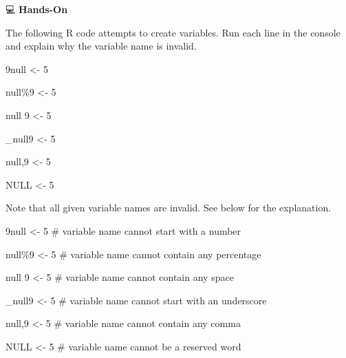 \documentclass[
  letterpaper,
  DIV=11,
  numbers=noendperiod]{scrreprt}
\newenvironment{Shaded}{\begin{snugshade}}{\end{snugshade}}
\newcommand{\CommentTok}[1]{\textcolor[rgb]{0.37,0.37,0.37}{#1}}
\newcommand{\ConstantTok}[1]{\textcolor[rgb]{0.56,0.35,0.01}{#1}}
\newcommand{\DecValTok}[1]{\textcolor[rgb]{0.68,0.00,0.00}{#1}}
\newcommand{\NormalTok}[1]{\textcolor[rgb]{0.00,0.23,0.31}{#1}}
\newcommand{\OtherTok}[1]{\textcolor[rgb]{0.00,0.23,0.31}{#1}}
\begin{document}
💻 \textbf{Hands-On}

The following R code attempts to create variables. Run each line in the
console and explain why the variable name is invalid.

\begin{Shaded}
\begin{Highlighting}[]
\DecValTok{9}\NormalTok{null }\OtherTok{\textless{}{-}} \DecValTok{5}

\NormalTok{null\%}\DecValTok{9} \OtherTok{\textless{}{-}} \DecValTok{5}

\NormalTok{null }\DecValTok{9} \OtherTok{\textless{}{-}} \DecValTok{5}

\NormalTok{\_null9 }\OtherTok{\textless{}{-}} \DecValTok{5} 

\NormalTok{null,}\DecValTok{9} \OtherTok{\textless{}{-}} \DecValTok{5}

\ConstantTok{NULL} \OtherTok{\textless{}{-}} \DecValTok{5}
\end{Highlighting}
\end{Shaded}

\begin{tcolorbox}[enhanced jigsaw, colbacktitle=quarto-callout-tip-color!10!white, opacitybacktitle=0.6, breakable, left=2mm, leftrule=.75mm, toprule=.15mm, toptitle=1mm, bottomtitle=1mm, colframe=quarto-callout-tip-color-frame, opacityback=0, coltitle=black, arc=.35mm, titlerule=0mm, colback=white, bottomrule=.15mm, title=\textcolor{quarto-callout-tip-color}{\faLightbulb}\hspace{0.5em}{Answer}, rightrule=.15mm]

Note that all given variable names are invalid. See below for the
explanation.

\begin{Shaded}
\begin{Highlighting}[]
\DecValTok{9}\NormalTok{null }\OtherTok{\textless{}{-}} \DecValTok{5}     \CommentTok{\# variable name cannot start with a number}

\NormalTok{null\%}\DecValTok{9} \OtherTok{\textless{}{-}} \DecValTok{5}    \CommentTok{\# variable name cannot contain any percentage}

\NormalTok{null }\DecValTok{9} \OtherTok{\textless{}{-}} \DecValTok{5}    \CommentTok{\# variable name cannot contain any space}

\NormalTok{\_null9 }\OtherTok{\textless{}{-}} \DecValTok{5}    \CommentTok{\# variable name cannot start with an underscore}

\NormalTok{null,}\DecValTok{9} \OtherTok{\textless{}{-}} \DecValTok{5}    \CommentTok{\# variable name cannot contain any comma}

\ConstantTok{NULL} \OtherTok{\textless{}{-}} \DecValTok{5}      \CommentTok{\# variable name cannot be a reserved word}
\end{Highlighting}
\end{Shaded}

\end{tcolorbox}
\end{document}
